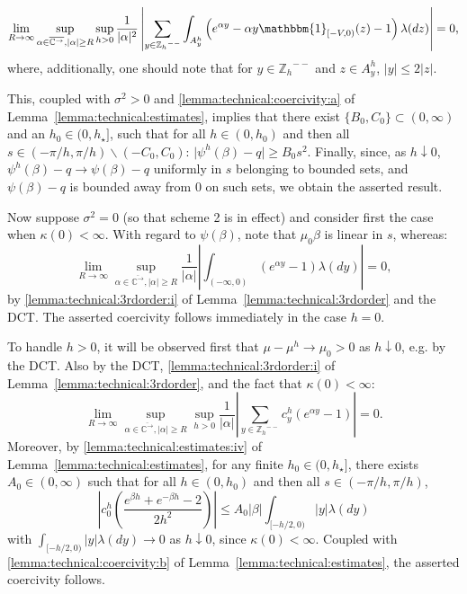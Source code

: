 \documentclass[pdftex,oneside,11pt,reqno]{amsart}
\theoremstyle{definition}
\theoremstyle{theorem}
\theoremstyle{remark}
\numberwithin{equation}{section}
\numberwithin{definition}{section}
\begin{document}
\begin{equation*}
\lim_{R\to\infty}\sup_{\alpha\in {\overline{\mathbb{C}^{\rightarrow}}},\vert \alpha\vert\geq R}\sup_{h>0}\frac{1}{\vert \alpha\vert^2}\left\vert\sum_{y\in{\mathbb{Z}_h}^{--}}\int_{A^h_y}\left(e^{\alpha y}-\alpha y{\mathbbm{1}_{[-V,0)}}(z)-1\right){\lambda}(dz)\right\vert= 0,
\end{equation*} 
where, additionally, one should note that for $y\in{\mathbb{Z}_h}^{--}$ and $z\in A_y^h$, $\vert y\vert\leq 2\vert z\vert$.

This, coupled with ${\sigma^2}>0$ and \ref{lemma:technical:coercivity:a} of Lemma~\ref{lemma:technical:estimates}, implies that there exist $\{B_0,C_0\}\subset (0,\infty)$ and an $h_0\in (0,h_\star]$, such that for all $h\in (0,h_0)$ and then all $s\in (-\pi/h,\pi/h) \backslash (-C_0,C_0)$: $\vert \psi^h(\beta)-q\vert\geq B_0 s^2$. Finally, since, as $h\downarrow 0$, $\psi^h(\beta)-q\to\psi(\beta)-q$ uniformly in $s$ belonging to bounded sets, and $\psi(\beta)-q$ is bounded away from $0$ on such sets, we obtain the asserted result.

Now suppose ${\sigma^2}=0$ (so that scheme 2 is in effect) and consider first the case when $\kappa(0)<\infty$. With regard to $\psi(\beta)$, note that $\mu_0\beta$ is linear in $s$, whereas:
\begin{equation}\label{eq:linear_coercivity}
\lim_{R\to\infty}\sup_{\alpha\in {\overline{\mathbb{C}^{\rightarrow}}},\vert \alpha\vert\geq R}\frac{1}{\vert \alpha\vert}\left\vert\int_{(-\infty,0)}\left(e^{\alpha y}-1\right){\lambda}(dy)\right\vert=0,
\end{equation}
by \ref{lemma:technical:3rdorder:i} of Lemma~\ref{lemma:technical:3rdorder} and the DCT. The asserted coercivity follows immediately in the case $h=0$. 

To handle $h>0$, it will be observed first that $\mu-\mu^h\to \mu_0>0$ as $h\downarrow 0$, e.g. by the DCT. Also by the DCT, \ref{lemma:technical:3rdorder:i} of Lemma~\ref{lemma:technical:3rdorder}, and the fact that $\kappa(0)<\infty$: $$\lim_{R\to\infty}\sup_{\alpha\in {\overline{\mathbb{C}^{\rightarrow}}},\vert \alpha\vert\geq R}\sup_{h>0}\frac{1}{\vert\alpha\vert}\left\vert \sum_{y\in {\mathbb{Z}_h}^{--}} c_y^h(e^{\alpha y}-1)\right\vert=0.$$ Moreover, by \ref{lemma:technical:estimates:iv} of Lemma~\ref{lemma:technical:estimates}, for any finite $h_0\in (0,h_\star]$, there exists $A_0\in (0,\infty)$ such that for all $h\in (0,h_0)$ and then all $s\in (-\pi/h,\pi/h)$, $$\left \vert c_0^h\left(\frac{e^{\beta h}+e^{-\beta h}-2}{2h^2}\right)\right\vert\leq A_0\vert \beta\vert \int_{[-h/2,0)}\vert y\vert{\lambda}(dy)$$ with $\int_{[-h/2,0)}\vert y\vert{\lambda}(dy)\to 0$ as $h\downarrow 0$, since $\kappa(0)<\infty$. Coupled with \ref{lemma:technical:coercivity:b} of Lemma~\ref{lemma:technical:estimates}, the asserted coercivity follows. 
\end{document}
